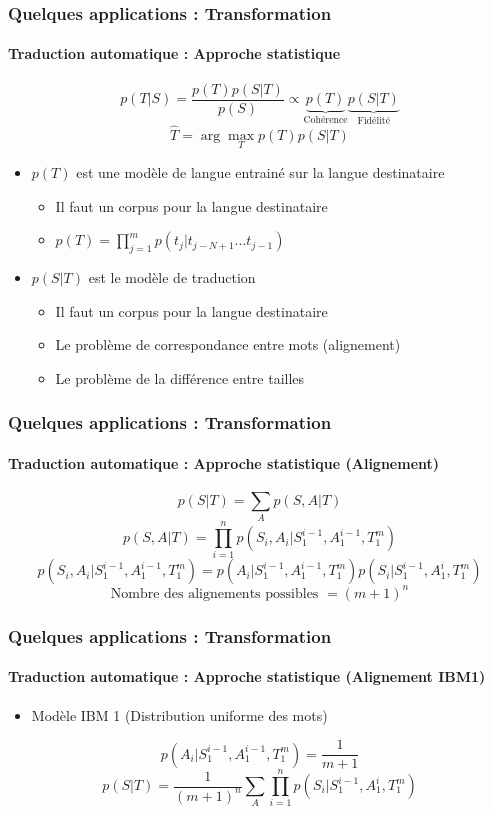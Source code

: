 \documentclass[xcolor=table]{beamer}
\begin{document}
\begin{frame}
	\frametitle{Quelques applications : Transformation}
	\framesubtitle{Traduction automatique : Approche statistique}
	\[
	p(T|S) = \frac{p(T) p(S|T)}{p(S)} \propto \underbrace{p(T)}_\text{Cohérence} \underbrace{p(S|T)}_\text{Fidélité}
	\]
	\[\hat{T} = \arg\max_{T} p(T) p(S|T)\]
	\[\]
	\begin{itemize}
		\item $p(T)$ est une modèle de langue entrainé sur la langue destinataire
		\begin{itemize}
			\item Il faut un corpus pour la langue destinataire
			\item $p(T) = \prod_{j=1}^m p(t_j|t_{j-N+1}\ldots t_{j-1})$
		\end{itemize}
		
		\item $p(S|T)$ est le modèle de traduction 
		\begin{itemize}
			\item Il faut un corpus pour la langue destinataire
			\item Le problème de correspondance entre mots (alignement)
			\item Le problème de la différence entre tailles
		\end{itemize}
	\end{itemize}
\end{frame}

\begin{frame}
	\frametitle{Quelques applications : Transformation}
	\framesubtitle{Traduction automatique : Approche statistique (Alignement)}
	\[p(S|T) = \sum_{A} p(S, A | T)\]
	\[p(S, A | T) = \prod_{i=1}^{n} p(S_i, A_i | S_1^{i-1}, A_1^{i-1}, T_1^{m})\]
	\[p(S_i, A_i | S_1^{i-1}, A_1^{i-1}, T_1^{m}) = p(A_i | S_1^{i-1}, A_1^{i-1}, T_1^{m}) p(S_i | S_1^{i-1}, A_1^{i}, T_1^{m})\]
	\[ \text{Nombre des alignements possibles } = (m + 1)^n\]
\end{frame}

\begin{frame}
	\frametitle{Quelques applications : Transformation}
	\framesubtitle{Traduction automatique : Approche statistique (Alignement IBM1)}
	\begin{itemize}
		\item Modèle IBM 1 (Distribution uniforme des mots)
	\end{itemize}

	\[p(A_i | S_1^{i-1}, A_1^{i-1}, T_1^{m}) = \frac{1}{m+1}\]
	\[p(S|T) = \frac{1}{(m+1)^n} \sum_{A} \prod_{i=1}^{n} p(S_i | S_1^{i-1}, A_1^{i}, T_1^{m})\]
\end{frame}
\end{document}
